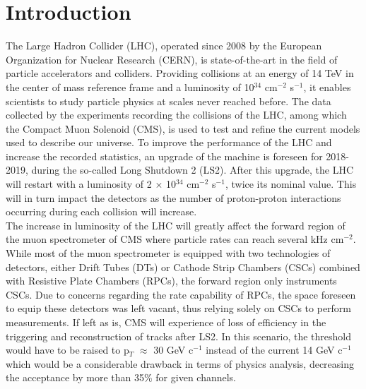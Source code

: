 \chapter*{Introduction}
\label{chap:0-4-introduction}

  The Large Hadron Collider (LHC), operated since 2008 by the European Organization for Nuclear Research (CERN), is state-of-the-art in the field of particle accelerators and colliders. Providing collisions at an energy of 14 TeV in the center of mass reference frame and a luminosity of 10$^{34}$ cm$^{-2}$ s$^{-1}$, it enables scientists to study particle physics at scales never reached before. The data collected by the experiments recording the collisions of the LHC, among which the Compact Muon Solenoid (CMS), is used to test and refine the current models used to describe our universe. To improve the performance of the LHC and increase the recorded statistics, an upgrade of the machine is foreseen for 2018-2019, during the so-called Long Shutdown 2 (LS2). After this upgrade, the LHC will restart with a luminosity of 2 $\times$ 10$^{34}$ cm$^{-2}$ s$^{-1}$, twice its nominal value. This will in turn impact the detectors as the number of proton-proton interactions occurring during each collision will increase. \\

  The increase in luminosity of the LHC will greatly affect the forward region of the muon spectrometer of CMS where particle rates can reach several kHz cm$^{-2}$. While most of the muon  spectrometer is equipped with two technologies of detectors, either Drift Tubes (DTs) or Cathode Strip Chambers (CSCs) combined with Resistive Plate Chambers (RPCs), the forward region only instruments CSCs. Due to concerns regarding the rate capability of RPCs, the space foreseen to equip these detectors was left vacant, thus relying solely on CSCs to perform measurements. If left as is, CMS will experience of loss of efficiency in the triggering and reconstruction of tracks after LS2. In this scenario, the threshold would have to be raised to p$_T$ $ \approx $ 30 GeV c$^{-1}$ instead of the current 14 GeV c$^{-1}$ which would be a considerable drawback in terms of physics analysis, decreasing the acceptance by more than 35\% for given channels. \\

